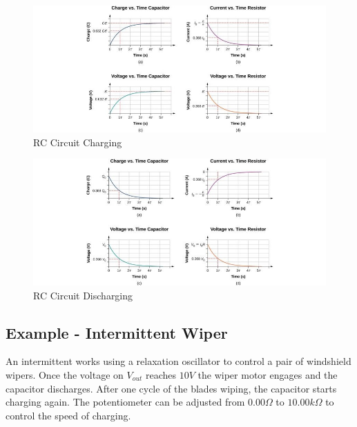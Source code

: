 \documentclass[14pt]{memoir}
\begin{document}
\begin{figure}[H]
\begin{center}
\includegraphics[scale=0.90]{fig/fig_10_39.jpg}
\caption{RC Circuit Charging}
\label{fig:10_39}
\end{center}
\end{figure}

\begin{figure}[H]
\begin{center}
\includegraphics[scale=0.90]{fig/fig_10_40.jpg}
\caption{RC Circuit Discharging}
\label{fig:10_40}
\end{center}
\end{figure}

\subsection{Example - Intermittent Wiper}

An intermittent works using a relaxation oscillator to control a pair of windshield wipers. Once the voltage on $V_{out}$ reaches $10V$ the wiper motor engages and the capacitor discharges. After one cycle of the blades wiping, the capacitor starts charging again. The potentiometer can be adjusted from $0.00 \Omega$ to $10.00k\Omega$ to control the speed of charging.  
\end{document}

